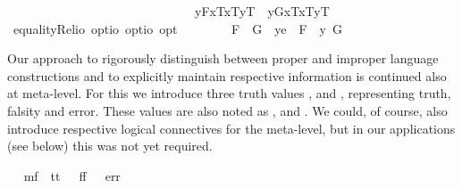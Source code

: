 \begin{isabellebody}
\ \ \ \ \ \ \ \ \ \ \ \ \ \ \ \ \ \ \ \ \ \ \ \ \ \ \ \ \ \isactrlbold {\isasymand}\ {\isacharparenleft}\isactrlbold {\isasymlambda}y{\isachardot}{\isasymlparr}F{}{\isacharcomma}x{}\isactrlsup T{\isacharcomma}x{}\isactrlsup T{\isacharcomma}y\isactrlsup T{\isasymrparr}{\isacharparenright}\ \isactrlbold {\isacharequal}\ {\isacharparenleft}\isactrlbold {\isasymlambda}y{\isachardot}{\isasymlparr}G{}{\isacharcomma}x{}\isactrlsup T{\isacharcomma}x{}\isactrlsup T{\isacharcomma}y\isactrlsup T{\isasymrparr}{\isacharparenright}{\isacharparenright}{\isachardoublequoteclose}\isanewline
\isanewline
\ \isamarkupfalse%
\ equalityRel{}{\isacharcolon}{\isacharcolon}{\isachardoublequoteopen}io\ opt{\isasymRightarrow}io\ opt{\isasymRightarrow}io\ opt{\isachardoublequoteclose}\ {\isacharparenleft}\ {\isachardoublequoteopen}\isactrlbold {\isacharequal}\ {}{}{\isacharparenright}\ \isanewline
\ \ \ \ {\isachardoublequoteopen}F{}\ \isactrlbold {\isacharequal}\ G{}\ {\isasymequiv}\ {\isacharparenleft}\isactrlbold {\isasymlambda}y{\isacharcolon}{\isacharcolon}e\ {\isachardot}\ F{}{\isacharparenright}\ \isactrlbold {\isacharequal}\ {\isacharparenleft}\isactrlbold {\isasymlambda}y{\isachardot}\ G{}{\isacharparenright}{\isachardoublequoteclose}%
\isamarkuptrue%
%
\begin{isamarkuptext}%
Our approach to rigorously distinguish between proper and improper language constructions 
  and to explicitly maintain respective information is continued also at meta-level. For this 
  we introduce three truth values ,
   and , representing truth, falsity and error. These values are also 
  noted as \isa{{\isasymtop}}, \isa{{\isasymbottom}} and \isa{{\isacharasterisk}}. We could, of course, also introduce  
  respective logical connectives for the meta-level, but in our applications (see below)
  this was not yet required.%
\end{isamarkuptext}\isamarkuptrue%
\ \isamarkupfalse%
\ mf\ {\isacharequal}\ tt\ {\isacharparenleft}{\isachardoublequoteopen}{\isasymtop}{\isachardoublequoteclose}{\isacharparenright}\ {\isacharbar}\ ff\ {\isacharparenleft}{\isachardoublequoteopen}{\isasymbottom}{\isachardoublequoteclose}{\isacharparenright}\ {\isacharbar}\ err\ {\isacharparenleft}{\isachardoublequoteopen}{\isacharasterisk}{\isachardoublequoteclose}{\isacharparenright}%

\end{isabellebody}
